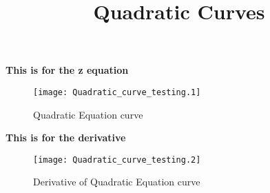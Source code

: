 \documentclass[a4paper]{article}
\begin{document}
\date{}
\title {Quadratic Curves}
\maketitle


\centerline{\bf This is for the z equation}
\begin{figure}[!ht]

\texttt{[image: Quadratic\_curve\_testing.1]}
\caption{Quadratic Equation curve}

\end{figure}

\vspace*{3\baselineskip}
\centerline{\bf This is for the derivative}
\begin{figure}[!ht]

\texttt{[image: Quadratic\_curve\_testing.2]}
\caption{Derivative of Quadratic Equation curve}

\end{figure}
\end{document}
